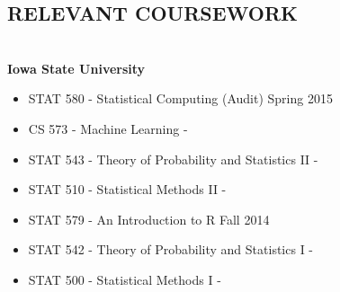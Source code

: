 \documentclass[10pt]{res} %
\begin{document}
\begin{resume}

\section{RELEVANT COURSEWORK}

\hrulefill \\
{\bf Iowa State University }
\begin{itemize}\itemsep -2pt
\item STAT 580 - Statistical Computing (Audit) \hfill Spring 2015
\item CS 573 - Machine Learning \hfill -
\item STAT 543 - Theory of Probability and Statistics II \hfill -
\item STAT 510 - Statistical Methods II \hfill -
\item STAT 579 - An Introduction to R \hfill Fall 2014
\item STAT 542 - Theory of Probability and Statistics I \hfill -
\item STAT 500 - Statistical Methods I \hfill -
\end{itemize}



\end{resume} 
\end{document}

